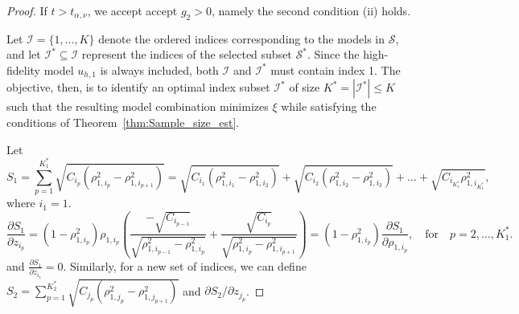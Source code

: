 \begin{proof}
    
If $t>t_{\alpha,\nu}$, we accept accept $g_2>0$, namely the second condition (ii) holds.



Let $\mathcal{I} = \{1,\ldots,K\}$ denote the ordered indices corresponding to the models in $\mathcal{S}$, and let $\mathcal{I}^*\subseteq \mathcal{I}$ represent the indices of the selected subset $\mathcal{S}^*$. Since the high-fidelity model $u_{h,1}$ is always included, both $\mathcal{I}$ and $\mathcal{I}^*$ must contain index 1. The objective, then, is to identify an optimal index subset $\mathcal{I}^*$ of size $K^* = |\mathcal{I}^*| \leq K$ such that the resulting model combination minimizes $\xi$ while satisfying the conditions of Theorem~\ref{thm:Sample_size_est}.

Let 
\[
S_1=\sum_{p=1}^{K_1^*}\sqrt{C_{i_p}(\rho_{1,i_p}^2-\rho_{1,i_{p+1}}^2)} = \sqrt{C_{i_1}(\rho_{1,i_1}^2-\rho_{1,i_2}^2)}+\sqrt{C_{i_2}(\rho_{1,i_2}^2-\rho_{1,i_3}^2)}+\ldots+\sqrt{C_{i_{K_1^*}}\rho_{1,i_{K_1^*}}^2},
\]
where $i_1=1$.
\[
\frac{\partial S_1}{\partial z_{i_p}} =(1- \rho_{1,{i_p}}^2) \rho_{1,{i_p}} \left(\frac{-\sqrt{C_{i_{p-1}}}}{\sqrt{ \rho_{1,{i_{p-1}}}^2-\rho_{1,{i_{p}}}^2}}+\frac{\sqrt{C_{i_p}}}{\sqrt{ \rho_{1,{i_p}}^2-\rho_{1,{i_{p+1}}}^2}} \right) = (1- \rho_{1,{i_p}}^2)\frac{\partial S_1}{\partial \rho_{1,i_p}}, \quad \text{for} \quad p = 2,\ldots,K_1^*.
\]
and $\frac{\partial S_1}{\partial z_{i_1}} = 0$. Similarly, for a new set of indices, we can define $S_2=\sum_{p=1}^{K_2^*}\sqrt{C_{j_p}( \rho_{1,j_p}^2-\rho_{1,j_{p+1}}^2)}$ and $\partial S_2/\partial z_{j_p}$.


\end{proof}
